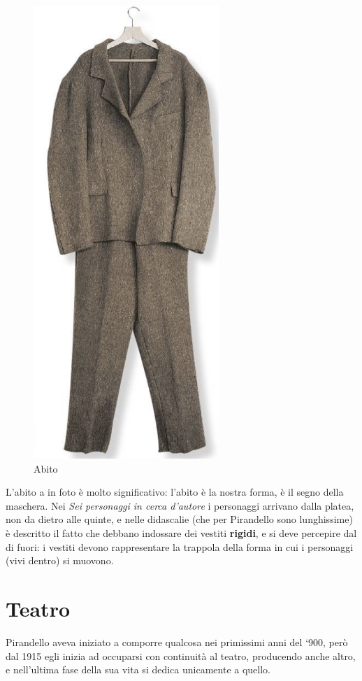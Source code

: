 \documentclass[a4paper, twoside, titlepage]{book}
\begin{document}
\begin{figure}
\begin{center}
\includegraphics[width=7cm]{abito}
\end{center}
\caption{Abito}
\end{figure}

L’abito a in foto è molto significativo: l’abito è la nostra forma, è il segno della maschera.
Nei \textit{Sei personaggi in cerca d’autore} i personaggi arrivano dalla platea, non da dietro alle quinte, e nelle didascalie (che per Pirandello sono lunghissime) è descritto il fatto che debbano indossare dei vestiti \textbf{rigidi}, e si deve percepire dal di fuori: i vestiti devono rappresentare la trappola della forma in cui i personaggi (vivi dentro) si muovono.

\chapter{Teatro}

Pirandello aveva iniziato a comporre qualcosa nei primissimi anni del ‘900, però dal 1915 egli inizia ad occuparsi con continuità al teatro, producendo anche altro, e nell’ultima fase della sua vita si dedica unicamente a quello.
\end{document}
